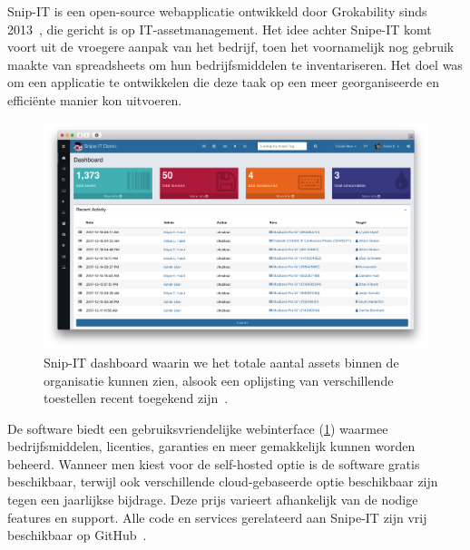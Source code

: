Snip-IT is een open-source webapplicatie ontwikkeld door Grokability sinds 2013~\autocite{snipe-it-introduction}, die gericht is op IT-assetmanagement.
Het idee achter Snipe-IT komt voort uit de vroegere aanpak van het bedrijf, toen het voornamelijk nog gebruik maakte van spreadsheets om hun bedrijfsmiddelen te inventariseren.
Het doel was om een applicatie te ontwikkelen die deze taak op een meer georganiseerde en effici\"ente manier kon uitvoeren.

\begin{figure}[h!]
    \includegraphics[width=\textwidth]
    {./graphics/snipe-dashboard.png}
    \caption{\label{fig:snipe-it-dashboard}Snip-IT dashboard waarin we het totale aantal assets binnen de organisatie kunnen zien, alsook een oplijsting van verschillende toestellen recent toegekend zijn~\autocite{snipe-it-dashboard}.}
\end{figure}

De software biedt een gebruiksvriendelijke webinterface (\ref{fig:snipe-it-dashboard}) waarmee bedrijfsmiddelen, licenties, garanties en meer gemakkelijk kunnen worden beheerd.
Wanneer men kiest voor de self-hosted optie is de software gratis beschikbaar, terwijl ook verschillende cloud-gebaseerde optie beschikbaar zijn tegen een jaarlijkse bijdrage.
Deze prijs varieert afhankelijk van de nodige features en support.
Alle code en services gerelateerd aan Snipe-IT zijn vrij beschikbaar op GitHub~\autocite{snipe-it-github}.

